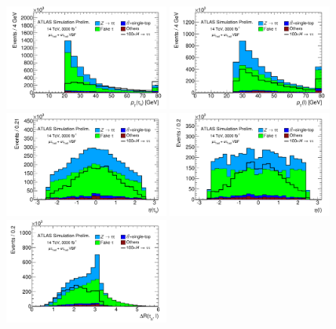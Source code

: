 \begin{figure}[!htpb]
  \centering
  \includegraphics[width=0.48\textwidth]{figures/ATL-PHYS-PUB-2014-018/fig_04a}
  \includegraphics[width=0.48\textwidth]{figures/ATL-PHYS-PUB-2014-018/fig_04b}
  \includegraphics[width=0.48\textwidth]{figures/ATL-PHYS-PUB-2014-018/fig_04c}
  \includegraphics[width=0.48\textwidth]{figures/ATL-PHYS-PUB-2014-018/fig_04d}
  \includegraphics[width=0.48\textwidth]{figures/ATL-PHYS-PUB-2014-018/fig_04e}

\end{figure}
